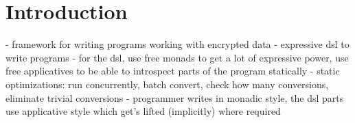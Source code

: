 \chapter{Introduction}
\label{cha:introduction}

\TODO
- framework for writing programs working with encrypted data
- expressive dsl to write programs
- for the dsl, use free monads to get a lot of expressive power, use
free applicatives to be able to introspect parts of the program
statically
- static optimizations: run concurrently, batch convert, check how
  many conversions, eliminate trivial conversions
- programmer writes in monadic style, the dsl parts use applicative
  style which get's lifted (implicitly) where required
